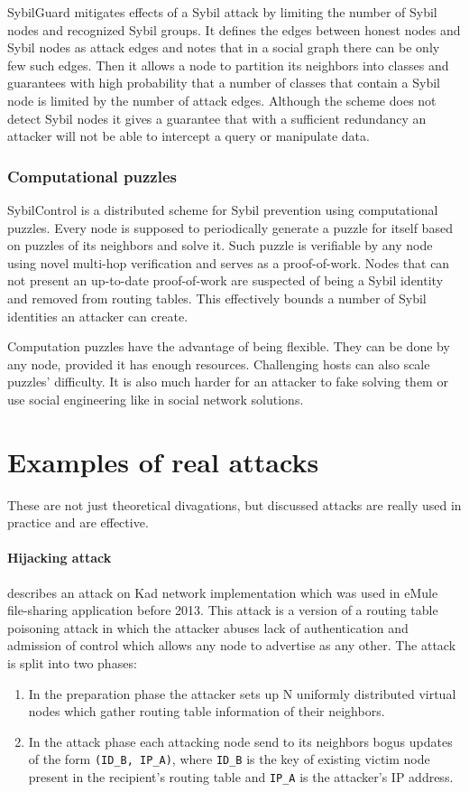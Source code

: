   SybilGuard \cite{hai06} mitigates effects of a Sybil attack by limiting the
  number of Sybil nodes and recognized Sybil groups. It defines the edges
  between honest nodes and Sybil nodes as attack edges and notes that in a
  social graph there can be only few such edges. Then it allows a node to
  partition its neighbors into classes and guarantees with high probability
  that a number of classes that contain a Sybil node is limited by the number of
  attack edges. Although the scheme does not detect Sybil nodes it gives a
  guarantee that with a sufficient redundancy an attacker will not be able to
  intercept a query or manipulate data.

  \subsubsection{Computational puzzles}
  SybilControl\cite{li12} is a distributed scheme for Sybil prevention using
  computational puzzles. Every node is supposed to periodically generate a
  puzzle for itself based on puzzles of its neighbors and solve it. Such puzzle
  is verifiable by any node using novel multi-hop verification and serves as a
  proof-of-work. Nodes that can not present an up-to-date proof-of-work are
  suspected of being a Sybil identity and removed from routing tables. This
  effectively bounds a number of Sybil identities an attacker can create.

  Computation puzzles have the advantage of being flexible. They can be done by
  any node, provided it has enough resources. Challenging hosts can also scale
  puzzles' difficulty. It is also much harder for an attacker to fake
  solving them or use social engineering like in social network solutions.

\section{Examples of real attacks}
These are not just theoretical divagations, but discussed attacks are really
used in practice and are effective.

\paragraph{Hijacking attack}
\cite{wan08} describes an attack on Kad network implementation which was used
in eMule file-sharing application before 2013. This attack is a version of a
routing table poisoning attack in which the attacker abuses lack of
authentication and admission of control which allows any node to advertise as
any other. The attack is split into two phases:
\begin{enumerate}
  \item In the preparation phase the attacker sets up N uniformly distributed
    virtual nodes which gather routing table information of their neighbors.
  \item In the attack phase each attacking node send to its neighbors bogus
    updates of the form \texttt{(ID\_B, IP\_A)}, where \texttt{ID\_B} is the key
    of existing victim node present in the recipient's routing table and
    \texttt{IP\_A} is the attacker's IP address.
\end{enumerate}

